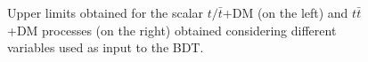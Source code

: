 \documentclass[a4paper, 10pt, openright]{report}
\begin{document}
\begin{appendices}
\begin{figure}[htbp]
{\begin{minipage}[b]{.48\textwidth}
\end{minipage} \hfill
}
\caption{Upper limits obtained for the scalar $t/\bar t$+DM (on the left) and $t \bar t$+DM processes (on the right) obtained considering different variables used as input to the \ac{BDT}.}
\label{fig:optVarBDT}
\end{figure}


\end{appendices}
\end{document}
